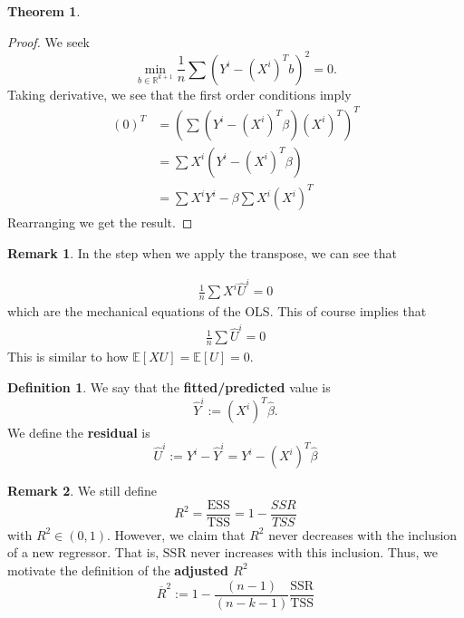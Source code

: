 \documentclass[10pt, oneside]{article}
\newcommand{\bbR}{\mathbb{R}}
\newcommand{\bbE}{\mathbb{E}}
\theoremstyle{definition}
\newtheorem{thm}{Theorem}
\newtheorem{defn}{Definition}
\newtheorem{rem}{Remark}
\begin{document}
\begin{thm}
\begin{center}
\end{center}

\end{thm}
\begin{proof}
    We seek 
    \[\min_{b \in \bbR^{k+1}}\frac{1}{n}\sum (Y^i - (X^i)^Tb)^2 = 0.\] Taking derivative, we see that the first order conditions imply 
    \begin{align*}
        (0)^T &= \left(\sum  (Y^i - (X^i)^T\beta)(X^i)^T\right)^T\\
        &= \sum X^i(Y^i - (X^i)^T\beta)\\
        &= \sum X^i Y^i - \beta\sum X^i(X^i)^T
    \end{align*}
    Rearranging we get the result.  
\end{proof}


\begin{rem}
    In the step when we apply the transpose, we can see that 

\begin{align}
    \frac{1}{n} \sum X^i \hat{U}^i = 0
\end{align}
     which are the mechanical equations of the OLS. This of course implies that 
\begin{align}
    \frac{1}{n} \sum \hat U^i = 0
\end{align}
This is similar to how $\bbE[XU] = \bbE[U] = 0.$
\end{rem}

\begin{defn}
    We say that the \textbf{fitted/predicted} value is 
    \[\hat Y^i := (X^i)^T \hat\beta.\]  We define the \textbf{residual} is 
    \[\hat U^i := Y^i - \hat Y^i = Y^i - (X^i)^T \hat\beta\]
\end{defn}
\begin{rem}
    We still define 
    \[R^2 = \frac{\text{ESS}}{\text{TSS}} = 1 - \frac{SSR}{TSS}\] with $R^2 \in (0,1).$ However, we claim that $R^2$ never decreases with the inclusion of a new regressor. That is, $\text{SSR}$ never increases with this inclusion. Thus, we motivate the definition of the \textbf{adjusted $R^2$} 
    \[\overline{R}^2 := 1- \frac{(n-1)}{(n-k-1)} \frac{\text{SSR}}{\text{TSS}}\]
\end{rem}
\end{document}
